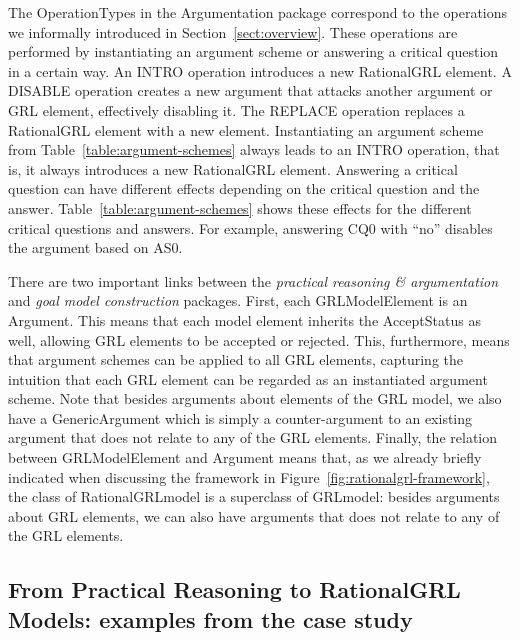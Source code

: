 The \textsf{OperationTypes} in the Argumentation package correspond to the operations we informally introduced in Section~\ref{sect:overview}. These operations are performed by instantiating an argument scheme or answering a critical question in a certain way. An \textsf{INTRO} operation introduces a new RationalGRL element. A \textsf{DISABLE} operation creates a new argument that attacks another argument or GRL element, effectively disabling it. The \textsf{REPLACE} operation replaces a RationalGRL element with a new element. Instantiating an argument scheme from Table~\ref{table:argument-schemes} always leads to an \textsf{INTRO} operation, that is, it always introduces a new RationalGRL element. Answering a critical question can have different effects depending on the critical question and the answer. Table~\ref{table:argument-schemes} shows these effects for the different critical questions and answers. For example, answering CQ0 with ``no'' disables the argument based on AS0. 

There are two important links between the \emph{practical reasoning \& argumentation} and \emph{goal model construction} packages. First, each \textsf{GRLModelElement} is an \textsf{Argument}. This means that each model element inherits the \textsf{AcceptStatus} as well, allowing GRL elements to be accepted or rejected. This, furthermore, means that argument schemes can be applied to all GRL elements, capturing the intuition that each GRL element can be regarded as an instantiated argument scheme. Note that besides arguments about elements of the GRL model, we also have a \textsf{GenericArgument} which is simply a counter-argument to an existing argument that does not relate to any of the GRL elements. Finally, the relation between \textsf{GRLModelElement} and \textsf{Argument} means that, as we already briefly indicated when discussing the framework in Figure~\ref{fig:rationalgrl-framework}, the class of \textsf{RationalGRLmodel} is a superclass of \textsf{GRLmodel}: besides arguments about GRL elements, we can also have arguments that does not relate to any of the GRL elements.

\subsection{From Practical Reasoning to RationalGRL Models: examples from the case study}
\label{sect:overview:examples}

